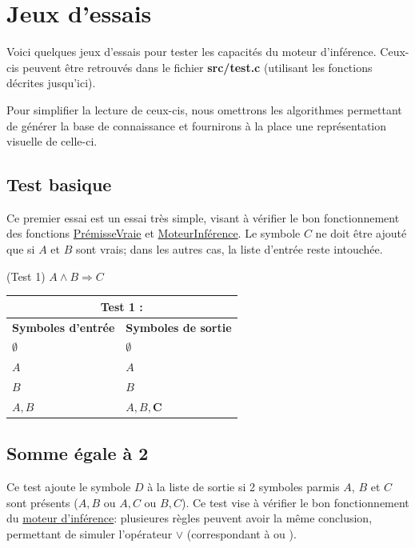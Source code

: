 \documentclass[12pt]{article}
\begin{document}
\newpage

\section{Jeux d'essais}


Voici quelques jeux d'essais pour tester les capacités du moteur d'inférence.
Ceux-cis peuvent être retrouvés dans le fichier \textbf{src/test.c} (utilisant les fonctions décrites jusqu'ici).

Pour simplifier la lecture de ceux-cis, nous omettrons les algorithmes permettant de générer la base de connaissance et fournirons à la place une représentation visuelle de celle-ci.

\subsection{Test basique}

Ce premier essai est un essai très simple, visant à vérifier le bon fonctionnement des fonctions \hyperref[PV]{PrémisseVraie} et \hyperref[MI]{MoteurInférence}.
Le symbole $C$ ne doit être ajouté que si $A$ et $B$ sont vrais; dans les autres cas, la liste d'entrée reste intouchée.

\begin{algorithm}
\BeginKB(Test 1\label{T1}){
  $A \land B \Rightarrow C$
}
\end{algorithm}

\begin{tabular}{|p{4cm}|p{6.5cm}|}
  \hline
  \multicolumn{2}{|c|}{\textbf{Test 1 :}} \\
  \hline
  \textbf{Symboles d'entrée} & \textbf{Symboles de sortie} \\
  \hline
  $\emptyset$ & $\emptyset$ \\
  \hline
  $A$ & $A$ \\
  \hline
  $B$ & $B$ \\
  \hline
  $A, B$ & $A, B, \mathbf{C}$ \\
  \hline
\end{tabular}

\subsection{Somme égale à 2}

Ce test ajoute le symbole $D$ à la liste de sortie si 2 symboles parmis $A$, $B$ et $C$ sont présents ($A, B$ ou $A, C$ ou $B, C$).
Ce test vise à vérifier le bon fonctionnement du \hyperref[MI]{moteur d'inférence}: plusieures règles peuvent avoir la même conclusion, permettant de simuler l'opérateur $\lor$ (correspondant à \og ou \fg).
\end{document}
